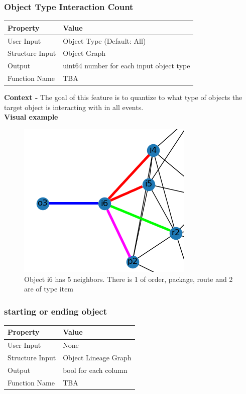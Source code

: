 \documentclass{article}
\begin{document}
\subsubsection{Object Type Interaction Count}
\begin{center}
	\begin{tabular}{| p{3cm} p{7cm} |}
		\hline
		\textbf{Property} & \textbf{Value}\\
		\hline
		User Input & Object Type (Default: All)\\
		Structure Input & Object Graph\\
		Output & uint64 number for each input object type\\
		Function Name & TBA\\
		\hline
	\end{tabular}
\end{center}

\textbf{Context -} The goal of this feature is to quantize to what type of objects the target object is interacting with in all events.
\\

\textbf{Visual example}
\begin{figure}[h]
	\centering
	\includegraphics[scale=0.5]{images/obj-tic.png}
	\caption{Object i6 has 5 neighbors. There is 1 of order, package, route and 2 are of type item}
	\label{fig:obj-tic}
\end{figure}

\subsubsection{starting or ending object}
\begin{center}
	\begin{tabular}{| p{3cm} p{7cm} |}
		\hline
		\textbf{Property} & \textbf{Value}\\
		\hline
		User Input & None\\
		Structure Input & Object Lineage Graph\\
		Output & bool for each column\\
		Function Name & TBA\\
		\hline
	\end{tabular}
\end{center}
\end{document}

